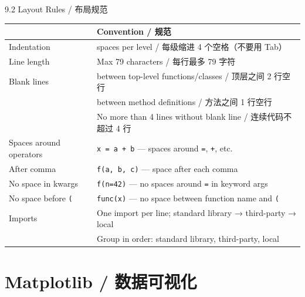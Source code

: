 \documentclass[11pt,a4paper]{report}
\let\oldtexttt\texttt
\renewcommand{\texttt}[1]{\textcolor{mainblue}{\oldtexttt{#1}}}
\begin{document}
\begin{cmdsection}{9.2  Layout Rules / 布局规范}
\normalsize\renewcommand{\arraystretch}{1.4}
\centering
\begin{tabularx}{\textwidth}{@{}>{\ttfamily}l>{\raggedright\arraybackslash}X@{}}
\toprule
\multicolumn{1}{@{}l}{\textbf{Rule}} & \textbf{Convention / 规范} \\ \midrule
Indentation             & 4 spaces per level / 每级缩进 4 个空格（不要用 Tab） \\
Line length             & Max 79 characters / 每行最多 79 字符 \\
Blank lines             & 2 between top-level functions/classes / 顶层之间 2 行空行 \\
                        & 1 between method definitions / 方法之间 1 行空行 \\
                        & No more than 4 lines without blank line / 连续代码不超过 4 行 \\
Spaces around operators & \texttt{x = a + b} — spaces around \texttt{=}, \texttt{+}, etc. \\
After comma             & \texttt{f(a, b, c)} — space after each comma \\
No space in kwargs      & \texttt{f(n=42)} — no spaces around \texttt{=} in keyword args \\
No space before \texttt{(} & \texttt{func(x)} — no space between function name and \texttt{(} \\
Imports                 & One import per line; standard library → third-party → local \\
                        & Group in order: standard library, third-party, local \\
\bottomrule
\end{tabularx}
\end{cmdsection}

\newpage

\chapter{Matplotlib / 数据可视化}
\end{document}
